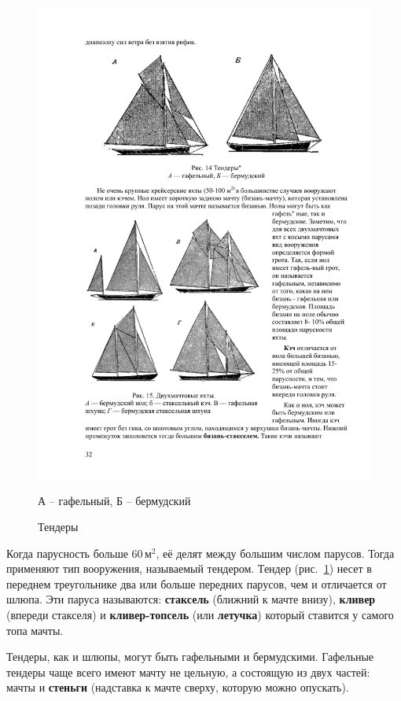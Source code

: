 \documentclass[a4paper, 12pt, twoside, final]{scrbook}
\begin{document}
\begin{figure}[htbp]
	\centering
	\includegraphics{Tendery}
	\protect\caption{\label{fig:14}Тендеры}
	\centering\small А \--- гафельный, Б \--- бермудский
\end{figure}


Когда парусность больше 60\,$\mbox{м}^2$, её делят между большим числом
парусов. Тогда применяют тип вооружения, называемый тендером. Тендер
(рис.~\ref{fig:14})
несет в переднем треугольнике два или больше передних парусов, чем
и отличается от шлюпа. Эти паруса называются: \textbf{стаксель} (ближний
к мачте внизу), \textbf{кливер} (впереди стакселя) и \textbf{кливер-топсель}
(или \textbf{летучка}) который ставится у самого топа мачты.

Тендеры, как и шлюпы, могут быть гафельными и бермудскими. Гафельные
тендеры чаще всего имеют мачту не цельную, а состоящую из двух частей:
мачты и \textbf{стеньги} (надставка к мачте сверху, которую можно
опускать).
\end{document}
